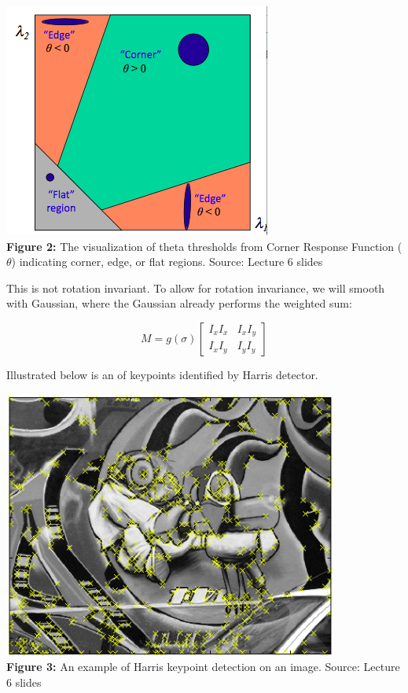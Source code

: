 \documentclass{article}
\begin{document}
\begin{center}
	\includegraphics[scale=0.5]{eigenvalues_harris.png}\\
    \textbf{Figure 2:} The visualization of theta thresholds from Corner Response Function ($\theta$) indicating corner, edge, or flat regions. Source: Lecture 6 slides\\
\end{center}

This is not rotation invariant. To allow for rotation invariance, we will smooth with Gaussian, where the Gaussian already performs the weighted sum:

\[M =
g( \sigma )
  \begin{bmatrix}
      I_x I_x & I_x I_y\\
      I_x I_y & I_y I_y
    \end{bmatrix}
\]

Illustrated below is an of keypoints identified by Harris detector.
\begin{center}
	\includegraphics[scale=0.5]{harris_response.png}\\
    \textbf{Figure 3:} An example of Harris keypoint detection on an image. Source: Lecture 6 slides \\
\end{center}
\end{document}
